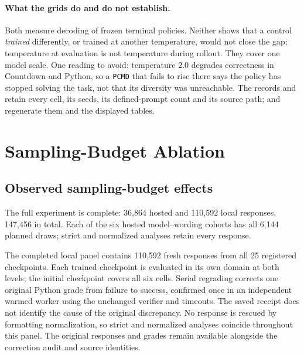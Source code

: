 \documentclass{article}
\newcommand{\1}{\mathbf 1}
\newcommand{\pmd}{\texttt{PCMD}}
\theoremstyle{remark}
\theoremstyle{definition}
\theoremstyle{plain}
\begin{document}
\paragraph{What the grids do and do not establish.}
Both measure decoding of frozen terminal policies. Neither shows that a control
\emph{trained} differently, or trained at another temperature, would not close
the gap; temperature at evaluation is not temperature during rollout. They
cover one model scale. One reading to avoid: temperature $2.0$ degrades
correctness in Countdown and Python, so a \pmd{} that fails to rise there says
the policy has stopped solving the task, not that its diversity was unreachable.
The records  and
 retain every cell, its seeds,
its defined-prompt count and its source path;
 and
 regenerate them and the displayed
tables.

\section{Sampling-Budget Ablation}
\label{app:sampling-budget-ablation}







\subsection{Observed sampling-budget effects}
\label{app:sampling-budget-effects}

The full experiment is complete: 36,864 hosted and 110,592 local responses,
147,456 in total. Each of the six hosted model--wording cohorts has all
6,144 planned draws; strict and normalized analyses retain every response.

The completed local panel contains 110,592 fresh responses from all 25
registered checkpoints. Each trained checkpoint is evaluated in its own domain
at both levels; the initial checkpoint covers all six cells. Serial regrading
corrects one original Python grade from failure to success, confirmed once
in an independent warmed worker using the unchanged verifier and timeouts.
The saved receipt does not identify the cause of the original discrepancy.
No response is rescued by formatting normalization, so strict and normalized
analyses coincide throughout this panel. The original responses and grades
remain available alongside the correction audit and source identities.
\end{document}
